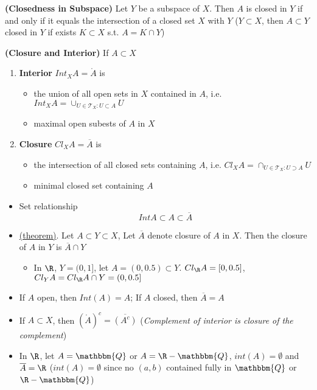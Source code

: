 \documentclass[10.5pt]{article}
\newcommand{\calT}{\mathcal{T}}
\newcommand{\Q}{\mathbbm{Q}}
\begin{document}
\begin{theorem*}
    \textbf{(Closedness in Subspace)} Let $Y$ be a subspace of $X$. Then $A$ is closed in $Y$ if and only if it equals the intersection of a closed set $X$ with $Y$ ($Y\subset X$, then $A\subset Y$ closed in $Y$ if exists $K\subset X$ s.t. $A=K\cap Y$)
\end{theorem*}


\begin{defn*}
    \textbf{(Closure and Interior)} If $A\subset X$
    \begin{enumerate}
        \item \textbf{Interior} $Int_X A = \mathring{A}$ is
        \begin{itemize}
            \item the union of all open sets in $X$ contained in $A$, i.e. $Int_X A = \cup_{U\in \calT_X : U\subset A} U$
            \item maximal open subests of $A$ in $X$
        \end{itemize}
        \item \textbf{Closure} $Cl_X A = \overline{A}$ is
        \begin{itemize}
            \item the intersection of all closed sets containing $A$, i.e. $Cl_X A = \cap_{U\in \calT_X : U\supset A} U$
            \item minimal closed set containing $A$
        \end{itemize}
    \end{enumerate}
    \begin{itemize}
        \item Set relationship
        \[
            Int A \subset A \subset \overline{A}    
        \]
        \item \underline{(theorem)}. Let $A\subset Y\subset X$, Let $\overline{A}$ denote closure of $A$ in $X$. Then the closure of $A$ in $Y$ is $\overline{A}\cap Y$
        \begin{itemize}
            \item In $\R$, $Y=(0,1]$, let $A=(0,0.5) \subset Y$. $Cl_{\R} A = [0, 0.5]$, $Cl_{Y} A = Cl_{\R} A \cap Y = (0, 0.5]$
        \end{itemize}
        \item If $A$ open, then $Int(A) = A$; If $A$ closed, then $\overline{A} = A$
        \item If $A\subset X$, then $(\mathring{A})^c = \overline{(A^c)}$ (\textit{Complement of interior is closure of the complement})
        \item In $\R$, let $A = \Q$ or $A = \R - \Q$, $int(A) = \emptyset$ and $\overline{A} = \R$ ($int(A)=\emptyset$ since no $(a,b)$ contained fully in $\Q$ or $\R-\Q$)
    \end{itemize}
\end{defn*}
\end{document}
